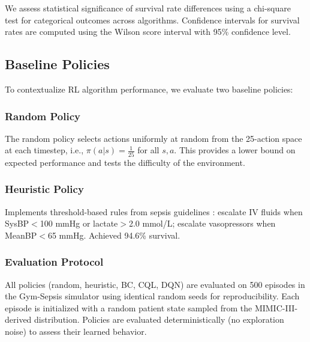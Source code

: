 We assess statistical significance of survival rate differences using a chi-square test for categorical outcomes across algorithms. Confidence intervals for survival rates are computed using the Wilson score interval with 95\% confidence level.

\subsection{Baseline Policies}\label{sec:methods:baselines}

To contextualize RL algorithm performance, we evaluate two baseline policies:

\subsubsection{Random Policy}

The random policy selects actions uniformly at random from the 25-action space at each timestep, i.e., $\pi(a|s) = \frac{1}{25}$ for all $s, a$. This provides a lower bound on expected performance and tests the difficulty of the environment.

\subsubsection{Heuristic Policy}

Implements threshold-based rules from sepsis guidelines \citep{rhodes2017ssc}: escalate IV fluids when SysBP$<$100 mmHg or lactate$>$2.0 mmol/L; escalate vasopressors when MeanBP$<$65 mmHg. Achieved 94.6\% survival.

\subsubsection{Evaluation Protocol}

All policies (random, heuristic, BC, CQL, DQN) are evaluated on 500 episodes in the Gym-Sepsis simulator using identical random seeds for reproducibility. Each episode is initialized with a random patient state sampled from the MIMIC-III-derived distribution. Policies are evaluated deterministically (no exploration noise) to assess their learned behavior.

